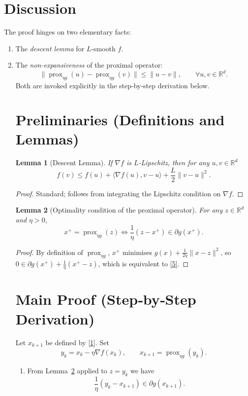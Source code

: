 \documentclass{article}
\newtheorem{lemma}{Lemma}
\newcommand{\prox}{\operatorname{prox}}
\newcommand{\grad}{\nabla}
\newcommand{\R}{\mathbb{R}}
\begin{document}
\section*{Discussion}
The proof hinges on two elementary facts:
\begin{enumerate}
\item The \emph{descent lemma} for $L$‑smooth $f$.
\item The \emph{non‑expansiveness} of the proximal operator:
\[
\|\prox_{\eta g}(u)-\prox_{\eta g}(v)\|\le \|u-v\|,\qquad\forall u,v\in\R^{d}.
\tag{3}
\]
Both are invoked explicitly in the step‑by‑step derivation below.

\section*{Preliminaries (Definitions and Lemmas)}
\begin{lemma}[Descent Lemma]\label{lem:descent}
If $\grad f$ is $L$‑Lipschitz, then for any $u,v\in\R^{d}$
\[
f(v)\le f(u)+\langle\grad f(u),v-u\rangle+\frac{L}{2}\|v-u\|^{2}.
\tag{4}
\]
\end{lemma}
\begin{proof}
Standard; follows from integrating the Lipschitz condition on $\grad f$.
\end{proof}

\begin{lemma}[Optimality condition of the proximal operator]\label{lem:prox_opt}
For any $z\in\R^{d}$ and $\eta>0$,
\[
x^{+}= \prox_{\eta g}(z) \iff \frac{1}{\eta}(z-x^{+})\in\partial g(x^{+}).
\tag{5}
\]
\end{lemma}
\begin{proof}
By definition of $\prox_{\eta g}$, $x^{+}$ minimises $g(x)+\frac1{2\eta}\|x-z\|^{2}$, so $0\in\partial g(x^{+})+\frac1\eta (x^{+}-z)$, which is equivalent to \eqref{5}.
\end{proof}

\section*{Main Proof (Step‑by‑Step Derivation)}
Let $x_{k+1}$ be defined by \eqref{1}. Set 
\[
y_{k}=x_{k}-\eta\grad f(x_{k}),\qquad x_{k+1}= \prox_{\eta g}(y_{k}).
\]

\begin{enumerate}
\item[Step 1.] From Lemma~\ref{lem:prox_opt} applied to $z=y_{k}$ we have  
\[
\frac{1}{\eta}(y_{k}-x_{k+1})\in\partial g(x_{k+1}).
\tag{6}
\]


\end{enumerate}
\end{enumerate}
\end{document}
